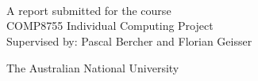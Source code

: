 \begin{titlepage}
  \enlargethispage{2cm}
  \begin{center}
    \makeatletter
    \Huge\textbf{\@title} \\[.4cm]
    \Huge\textbf{\thesisqualifier} \\[2.5cm]
    \huge\textbf{\@author} \\[9cm]
    \makeatother
    \LARGE A report submitted for the course \\
    COMP8755 Individual Computing Project \\
    Supervised by: Pascal Bercher and Florian Geisser
    
    The Australian National University \\[2cm]
    \thismonth
    
    \vspace*{\fill}
    \makeatletter
        {\selectfont\textcopyright}\ \@author{} \number\year
        \makeatother
   
    
  \end{center}
\end{titlepage}
